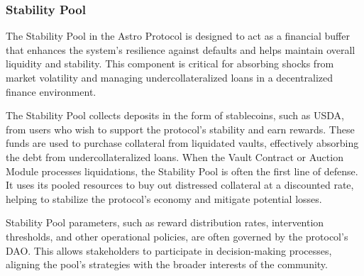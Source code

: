\subsubsection{Stability Pool}
The Stability Pool in the Astro Protocol is designed to act as a financial buffer that enhances the system's resilience against defaults and helps maintain overall liquidity and stability. This component is critical for absorbing shocks from market volatility and managing undercollateralized loans in a decentralized finance environment.

The Stability Pool collects deposits in the form of stablecoins, such as USDA, from users who wish to support the protocol’s stability and earn rewards. These funds are used to purchase collateral from liquidated vaults, effectively absorbing the debt from undercollateralized loans. When the Vault Contract or Auction Module processes liquidations, the Stability Pool is often the first line of defense. It uses its pooled resources to buy out distressed collateral at a discounted rate, helping to stabilize the protocol’s economy and mitigate potential losses.

Stability Pool parameters, such as reward distribution rates, intervention thresholds, and other operational policies, are often governed by the protocol’s DAO. This allows stakeholders to participate in decision-making processes, aligning the pool’s strategies with the broader interests of the community.

